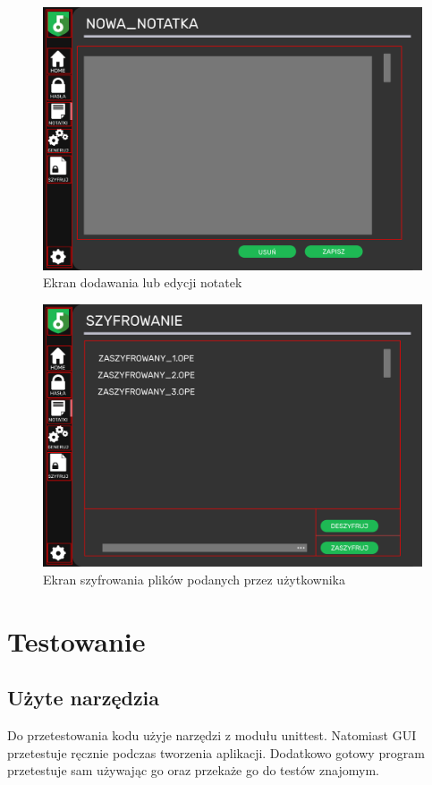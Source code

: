 \documentclass[a4paper]{article}
\begin{document}
\begin{figure}[H]
    \centering
    \includegraphics[width=1\textwidth]{img/ekran_nowej_not.png}
    \caption{Ekran dodawania lub edycji notatek}
    \label{fig:notatkNowe}
\end{figure}

\begin{figure}[H]
    \centering
    \includegraphics[width=1\textwidth]{img/ekran_szyfrowania.png}
    \caption{Ekran szyfrowania plików podanych przez użytkownika}
    \label{fig:szyfrowanie}
\end{figure}



\section{Testowanie}
\subsection{Użyte narzędzia}
Do przetestowania kodu użyje narzędzi z modułu unittest. Natomiast GUI przetestuje ręcznie podczas tworzenia aplikacji. Dodatkowo gotowy program przetestuje sam używając go oraz przekaże go do testów znajomym.
\end{document}
